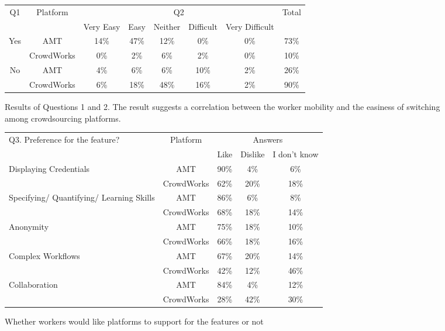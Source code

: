 \begin{figure}[t]
\centering
\begin{tabular}{|c|c|c|c|c|c|c|c|}
\hline
Q1&Platform&\multicolumn{5}{|c|}{Q2}&Total\\
\cline{3-7}
&&Very Easy & Easy& Neither & Difficult & Very Difficult&\\
\hline
Yes&AMT&14\%&47\%&12\%&0\%&0\%&73\%\\
&CrowdWorks&0\%&2\%&6\%&2\%&0\%&10\%\\
\hline
No&AMT&4\%&6\%&6\%&10\%&2\%&26\%\\
&CrowdWorks&6\%&18\%&48\%&16\%&2\%&90\%\\
\hline
\end{tabular}
\caption{Results of Questions 1 and 2. The result suggests a correlation between the worker mobility  and the easiness of switching among crowdsourcing platforms.}
\label{fig:surveyresult1}
\end{figure}

\begin{figure}
    \centering
\begin{tabular}{|l|c|c|c|c|}
\hline
Q3. Preference for the feature?&Platform&\multicolumn{3}{|c|}{Answers}\\
\cline{3-5}
&&Like&Dislike&I don't know\\
\hline
Displaying Credentials&AMT&90\%&4\%&6\%\\
\cline{2-5}
&CrowdWorks&62\%&20\%&18\%\\
\hline
Specifying/ Quantifying/ Learning Skills&AMT&86\%&6\%&8\%\\
\cline{2-5}
&CrowdWorks&68\%&18\%&14\%\\
\hline
Anonymity&AMT&75\%&18\%&10\%\\
\cline{2-5}
&CrowdWorks&66\%&18\%&16\%\\
\hline
Complex Workflows&AMT&67\%&20\%&14\%\\
\cline{2-5}
&CrowdWorks&42\%&12\%&46\%\\
\hline
Collaboration&AMT&84\%&4\%&12\%\\
\cline{2-5}
&CrowdWorks&28\%&42\%&30\%\\
\hline
\end{tabular}
    \caption{Whether workers would like platforms to support for the features or not}
    \label{fig:surveyresult2}
\end{figure}

